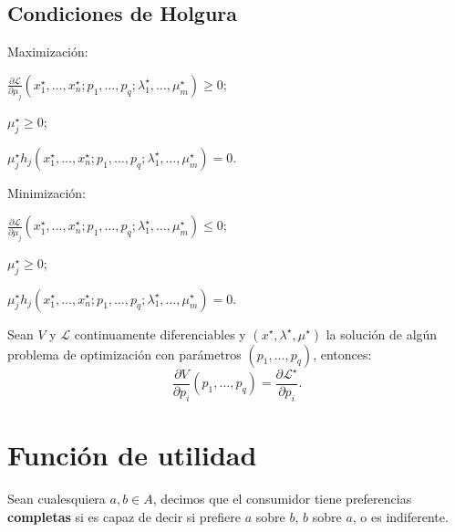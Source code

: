 \documentclass[8pt,a4paper]{extarticle}
\begin{document}
\begin{multicols}{3}
\subsection*{Condiciones de Holgura}

\begin{bulletlist}
\item Maximización:
\item[] $\displaystyle \frac{\partial \mathcal{L}}{\partial \mu_j} (x_{1}^{\star}, \ldots, x_{n}^{\star}; p_1, \ldots, p_q; \lambda_{1}^{\star}, \ldots, \mu_{m}^{\star}) \ge 0$;
\item[] $\displaystyle \mu_j^{\star} \ge 0$;
\item[] $\displaystyle \mu_j^{\star} h_j (x_{1}^{\star}, \ldots, x_{n}^{\star}; p_1, \ldots, p_q; \lambda_{1}^{\star}, \ldots, \mu_{m}^{\star}) = 0$.
\item Minimización:
\item[] $\displaystyle \frac{\partial \mathcal{L}}{\partial \mu_j} (x_{1}^{\star}, \ldots, x_{n}^{\star}; p_1, \ldots, p_q; \lambda_{1}^{\star}, \ldots, \mu_{m}^{\star}) \le 0$;
\item[] $\displaystyle \mu_j^{\star} \ge 0$;
\item[] $\displaystyle \mu_j^{\star} h_j (x_{1}^{\star}, \ldots, x_{n}^{\star}; p_1, \ldots, p_q; \lambda_{1}^{\star}, \ldots, \mu_{m}^{\star}) = 0$.
\end{bulletlist}

\begin{boxtheo}
	Sean $V$ y $\mathcal{L}$ continuamente diferenciables y $(x^{\star}, \lambda^{\star}, \mu^{\star})$ la solución de algún problema de optimización con parámetros $(p_1, \ldots, p_q)$, entonces:
	\[
		\frac{\partial V}{\partial p_i} (p_1, \ldots, p_q) = \frac{\partial \mathcal{L}^{\star}}{\partial p_i}
	.\] 
\end{boxtheo}

\newpage

\section{Función de utilidad}

\begin{boxdef}[Completitud]
	Sean cualesquiera $a, b \in A$, decimos que el consumidor tiene preferencias \textbf{completas} si es capaz de decir si prefiere $a$ sobre $b$, $b$ sobre $a$, o es indiferente.
\end{boxdef}


\end{multicols}
\end{document}

